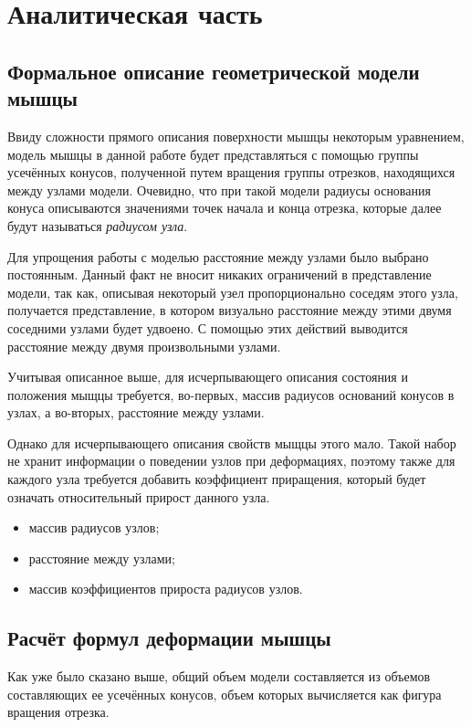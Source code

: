 \chapter{Аналитическая часть}

\section{Формальное описание геометрической модели мышцы}

Ввиду сложности прямого описания поверхности мышцы некоторым уравнением, модель мышцы в данной работе будет представляться с помощью группы усечённых конусов, полученной путем вращения группы отрезков, находящихся между узлами модели. Очевидно, что при такой модели радиусы основания конуса описываются значениями точек начала и конца отрезка, которые далее будут называться \textit{радиусом узла}.

Для упрощения работы с моделью расстояние между узлами было выбрано постоянным. Данный факт не вносит никаких ограничений в представление модели, так как, описывая некоторый узел пропорционально соседям этого узла, получается представление, в котором визуально расстояние между этими двумя соседними узлами будет удвоено. С помощью этих действий выводится расстояние между двумя произвольными узлами.

Учитывая описанное выше, для исчерпывающего описания состояния и положения мыщцы требуется, во-первых, массив радиусов оснований конусов в узлах, а во-вторых, расстояние между узлами.

Однако для исчерпывающего описания свойств мыщцы этого мало. Такой набор не хранит информации о поведении узлов при деформациях, поэтому также для каждого узла требуется добавить коэффициент приращения, который будет означать относительный прирост данного узла.
\begin{itemize}
    \item массив радиусов узлов;
    \item расстояние между узлами;
    \item массив коэффициентов прироста радиусов узлов.
\end{itemize}

\section{Расчёт формул деформации мышцы}

Как уже было сказано выше, общий объем модели составляется из объемов составляющих ее усечённых конусов, объем которых вычисляется как фигура вращения отрезка. 

